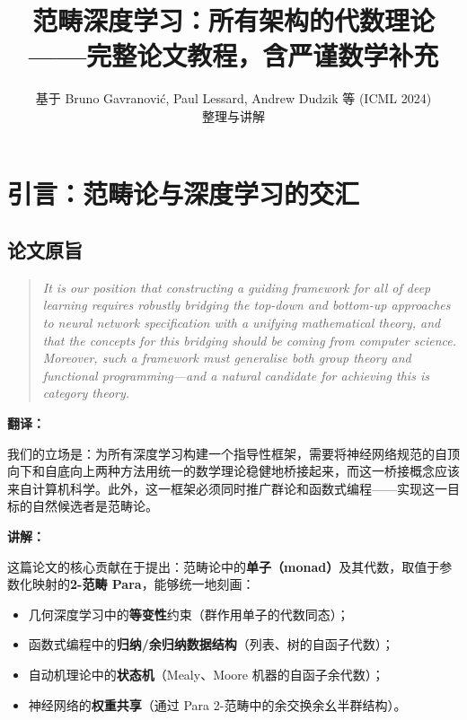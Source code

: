 \documentclass[12pt,a4paper]{ctexart}
\title{\textbf{范畴深度学习：所有架构的代数理论}\\[0.3em]
\large ——完整论文教程，含严谨数学补充}
\author{基于 Bruno Gavranović, Paul Lessard, Andrew Dudzik 等 (ICML 2024)\\ 整理与讲解}
\date{}
\theoremstyle{definition}
\begin{document}
\maketitle

\tableofcontents
\newpage

\section{引言：范畴论与深度学习的交汇}

\subsection{论文原旨}

\begin{quote}
\itshape
It is our position that constructing a guiding framework for all of deep learning requires robustly bridging the top-down and bottom-up approaches to neural network specification with a unifying mathematical theory, and that the concepts for this bridging should be coming from computer science. Moreover, such a framework must generalise both group theory and functional programming---and a natural candidate for achieving this is category theory.
\end{quote}

\textbf{翻译：}

我们的立场是：为所有深度学习构建一个指导性框架，需要将神经网络规范的自顶向下和自底向上两种方法用统一的数学理论稳健地桥接起来，而这一桥接概念应该来自计算机科学。此外，这一框架必须同时推广群论和函数式编程——实现这一目标的自然候选者是范畴论。

\textbf{讲解：}

这篇论文的核心贡献在于提出：范畴论中的\textbf{单子（monad）}及其代数，取值于参数化映射的\textbf{2-范畴 Para}，能够统一地刻画：
\begin{itemize}[nosep]
    \item 几何深度学习中的\textbf{等变性}约束（群作用单子的代数同态）；
    \item 函数式编程中的\textbf{归纳/余归纳数据结构}（列表、树的自函子代数）；
    \item 自动机理论中的\textbf{状态机}（Mealy、Moore 机器的自函子余代数）；
    \item 神经网络的\textbf{权重共享}（通过 Para 2-范畴中的余交换余幺半群结构）。
\end{itemize}
\end{document}

